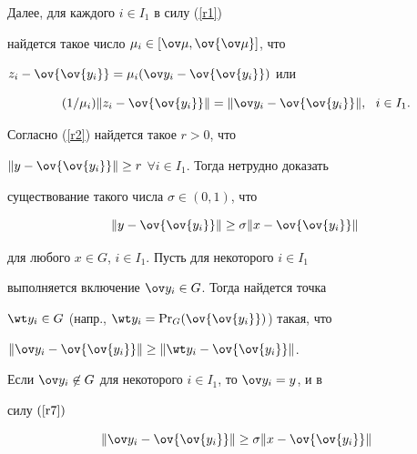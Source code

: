 \begin{pf}
\begin{equation}
\end{equation}


%


Далее, для каждого $i\in I_1$ в силу (\ref{r1})


найдется такое число $\mu_i \in [\ov \mu,


\ov{\ov\mu}]$, что


$z_i-\ov{\ov{y_i}}=\mu_i(\ov y_i-\ov{\ov{y_i}})$ или




\begin{equation} \label{r6}


(1/\mu_i)\| z_i-\ov{\ov{y_i}}\| =\| \ov y_i- \ov{\ov{y_i}}\|,


\ \ i\in I_1.


\end{equation}


%


Согласно (\ref{r2}) найдется такое $r>0$, что


$\| y-\ov{\ov{y_i}}\| \ge r$ $\forall i\in I_1$. Тогда нетрудно доказать


существование такого числа $\sigma\in (0,1)$, что




\begin{equation} \label{r7}


\| y-\ov{\ov{y_i}}\| \ge \sigma \| x- \ov{\ov{y_i}}\| \;


\end{equation}


%


для любого $x\in G$, $i\in I_1$. Пусть для некоторого $i\in I_1$


выполняется включение $\ov y_i\in G$. Тогда найдется точка


$\wt y_i\in G$ (напр., $\wt y_i=\mathrm{Pr}_G(\ov{\ov{y_i}})$) такая, что


$\|\ov y_i -\ov{\ov{y_i}}\| \ge \| \wt y_i-\ov{\ov{y_i}}\|$.


Если $\ov y_i \not \in G$ для некоторого $i\in I_1$, то $\ov y_i=y$, и в


силу $(\ref{r7})$




\begin{equation} \label{r8}


\| \ov y_i -\ov{\ov{y_i}}\| \ge \sigma \| x- \ov{\ov{y_i}}\|


\end{equation}


%



\end{pf}
